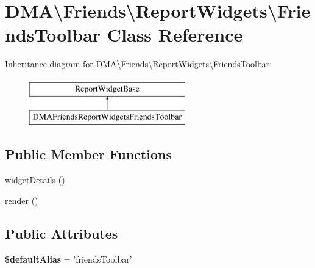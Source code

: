 \hypertarget{classDMA_1_1Friends_1_1ReportWidgets_1_1FriendsToolbar}{\section{D\-M\-A\textbackslash{}Friends\textbackslash{}Report\-Widgets\textbackslash{}Friends\-Toolbar Class Reference}
\label{classDMA_1_1Friends_1_1ReportWidgets_1_1FriendsToolbar}
}
Inheritance diagram for D\-M\-A\textbackslash{}Friends\textbackslash{}Report\-Widgets\textbackslash{}Friends\-Toolbar\-:\begin{figure}[H]
\begin{center}
\leavevmode
\includegraphics[height=2.000000cm]{d4/d8c/classDMA_1_1Friends_1_1ReportWidgets_1_1FriendsToolbar}
\end{center}
\end{figure}
\subsection*{Public Member Functions}
\begin{DoxyCompactItemize}
\item 
\hyperlink{classDMA_1_1Friends_1_1ReportWidgets_1_1FriendsToolbar_a56951946e166c46353910da4a5c399a1}{widget\-Details} ()
\item 
\hyperlink{classDMA_1_1Friends_1_1ReportWidgets_1_1FriendsToolbar_a5fb3de1ff5dd5186e068dcf8c5e8d154}{render} ()
\end{DoxyCompactItemize}
\subsection*{Public Attributes}
\begin{DoxyCompactItemize}
\item 
\hypertarget{classDMA_1_1Friends_1_1ReportWidgets_1_1FriendsToolbar_aabef17c5a99fc5f66554a91dd2cde59d}{{\bfseries \$default\-Alias} = 'friends\-Toolbar'}\label{classDMA_1_1Friends_1_1ReportWidgets_1_1FriendsToolbar_aabef17c5a99fc5f66554a91dd2cde59d}

\end{DoxyCompactItemize}


